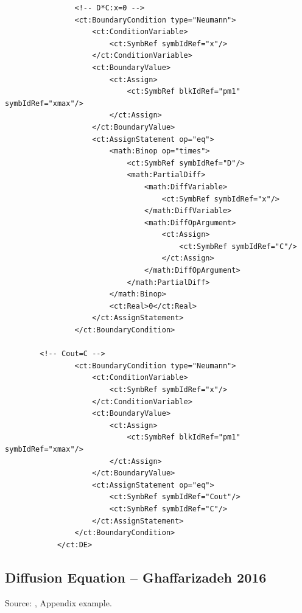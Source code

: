\begin{lstlisting}
                <!-- D*C:x=0 -->
                <ct:BoundaryCondition type="Neumann"> 
                    <ct:ConditionVariable>
                        <ct:SymbRef symbIdRef="x"/>
                    </ct:ConditionVariable>
                    <ct:BoundaryValue>
                        <ct:Assign>
                            <ct:SymbRef blkIdRef="pm1" symbIdRef="xmax"/>
                        </ct:Assign>
                    </ct:BoundaryValue>
                    <ct:AssignStatement op="eq">
                        <math:Binop op="times">
                            <ct:SymbRef symbIdRef="D"/>
                            <math:PartialDiff>
                                <math:DiffVariable>
                                    <ct:SymbRef symbIdRef="x"/>
                                </math:DiffVariable>
                                <math:DiffOpArgument>
                                    <ct:Assign>
                                        <ct:SymbRef symbIdRef="C"/>
                                    </ct:Assign>
                                </math:DiffOpArgument>
                            </math:PartialDiff>
                        </math:Binop>
                        <ct:Real>0</ct:Real>
                    </ct:AssignStatement>
                </ct:BoundaryCondition>

		<!-- Cout=C -->
                <ct:BoundaryCondition type="Neumann"> 
                    <ct:ConditionVariable>
                        <ct:SymbRef symbIdRef="x"/>
                    </ct:ConditionVariable>
                    <ct:BoundaryValue>
                        <ct:Assign>
                            <ct:SymbRef blkIdRef="pm1" symbIdRef="xmax"/>
                        </ct:Assign>
                    </ct:BoundaryValue>
                    <ct:AssignStatement op="eq">
                        <ct:SymbRef symbIdRef="Cout"/>
                        <ct:SymbRef symbIdRef="C"/>
                    </ct:AssignStatement>
                </ct:BoundaryCondition>
            </ct:DE>
\end{lstlisting}



\bigskip
\subsection{Diffusion Equation -- Ghaffarizadeh 2016}
\label{sec:diffusionEq}
Source: \cite{Ghaffarizadeh:2016kq}, Appendix example.

